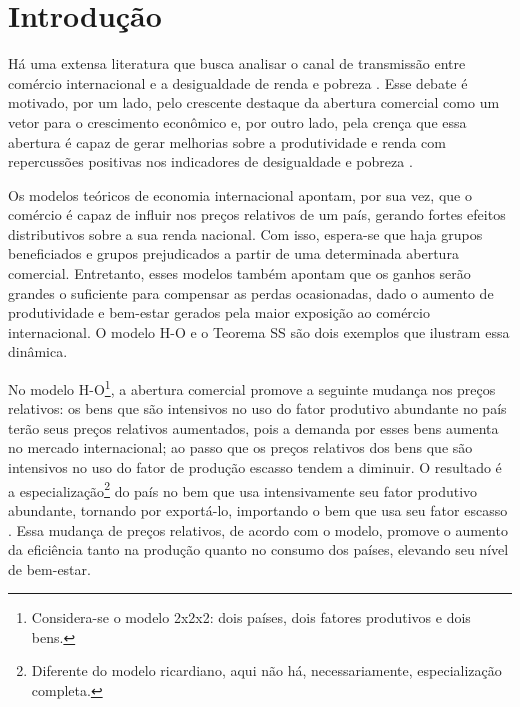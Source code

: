 

\chapter{Introdução} \label{cha:introducao}

Há uma extensa literatura que busca analisar o canal de transmissão entre comércio internacional e a desigualdade de renda e pobreza \cite{ferreira06, castilho12, bayar17, anderson20}. Esse debate é motivado, por um lado, pelo crescente destaque da abertura comercial como um vetor para o crescimento econômico \cite{atkin22} e, por outro lado, pela crença que essa abertura é capaz de gerar melhorias sobre a produtividade e renda com repercussões positivas nos indicadores de desigualdade e pobreza \cite{carneiro06}.

Os modelos teóricos de economia internacional apontam, por sua vez, que o comércio é capaz de influir nos preços relativos de um país, gerando fortes efeitos distributivos sobre a sua renda nacional. Com isso, espera-se que haja grupos beneficiados e grupos prejudicados a partir de uma determinada abertura comercial. Entretanto, esses modelos também apontam que os ganhos serão grandes o suficiente para compensar as perdas ocasionadas, dado o aumento de produtividade e bem-estar gerados pela maior exposição ao comércio internacional. O modelo H-O \cite{heckscher49, ohlin67} e o Teorema SS \cite{stolper41} são dois exemplos que ilustram essa dinâmica.

No modelo H-O\footnote{Considera-se o modelo 2x2x2: dois países, dois fatores produtivos e dois bens.}, a abertura comercial promove a seguinte mudança nos preços relativos: os bens que são intensivos no uso do fator produtivo abundante no país terão seus preços relativos aumentados, pois a demanda por esses bens aumenta no mercado internacional; ao passo que os preços relativos dos bens que são intensivos no uso do fator de produção escasso tendem a diminuir. O resultado é a especialização\footnote{Diferente do modelo ricardiano, aqui não há, necessariamente, especialização completa.} do país no bem que usa intensivamente seu fator produtivo abundante, tornando por exportá-lo,  importando o bem que usa seu fator escasso \cite{heckscher49, ohlin67}. Essa mudança de preços relativos, de acordo com o modelo, promove o aumento da eficiência tanto na produção quanto no consumo dos países, elevando seu nível de bem-estar.

